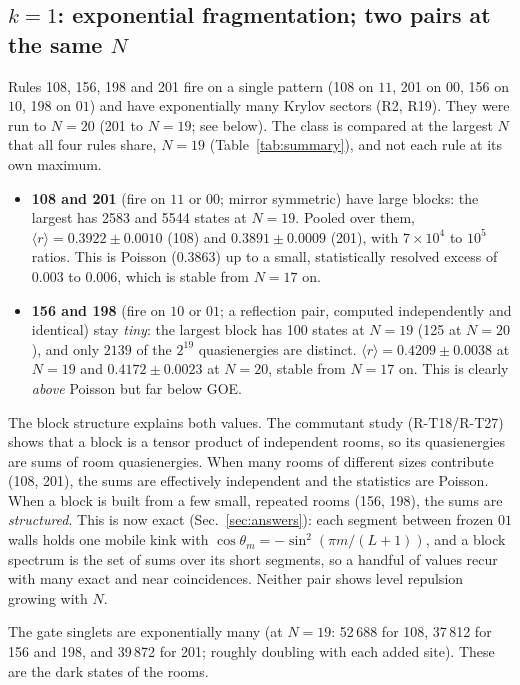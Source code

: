 \subsection{$k=1$: exponential fragmentation; two pairs at the same $N$}
Rules 108, 156, 198 and 201 fire on a single pattern (108 on $11$, 201 on $00$, 156 on $10$, 198 on $01$) and have
exponentially many Krylov sectors (R2, R19). They were run to $N=20$ (201 to $N=19$; see below). The class is compared
at the largest $N$ that all four rules share, $N=19$ (Table~\ref{tab:summary}), and not each rule at its own maximum.
\begin{itemize}
\item \textbf{108 and 201} (fire on $11$ or $00$; mirror symmetric) have large blocks: the largest has 2583 and 5544
  states at $N=19$. Pooled over them, $\langle r\rangle=0.3922\pm0.0010$ (108) and $0.3891\pm0.0009$ (201), with
  $7\times10^4$ to $10^5$ ratios. This is Poisson ($0.3863$) up to a small, statistically resolved excess of
  0.003 to 0.006, which is stable from $N=17$ on.
\item \textbf{156 and 198} (fire on $10$ or $01$; a reflection pair, computed independently and identical) stay
  \emph{tiny}: the largest block has 100 states at $N=19$ (125 at $N=20$), and only $2139$ of the $2^{19}$ quasienergies are
  distinct. $\langle r\rangle=0.4209\pm0.0038$ at $N=19$ and $0.4172\pm0.0023$ at $N=20$, stable from $N=17$ on.
  This is clearly \emph{above} Poisson but far below GOE.
\end{itemize}
The block structure explains both values. The commutant study (R-T18/R-T27) shows that a block is a tensor product of
independent rooms, so its quasienergies are sums of room quasienergies. When many rooms of different sizes contribute
(108, 201), the sums are effectively independent and the statistics are Poisson. When a block is built from a few small,
repeated rooms (156, 198), the sums are \emph{structured}. This is now exact (Sec.~\ref{sec:answers}): each
segment between frozen $01$ walls holds one mobile kink with $\cos\theta_m=-\sin^2(\pi m/(L+1))$, and a block
spectrum is the set of sums over its short segments, so a handful of values recur with many exact and near coincidences. Neither pair shows level
repulsion growing with $N$.

The gate singlets are exponentially many (at $N=19$: 52\,688 for 108, 37\,812 for 156 and 198, and 39\,872 for 201;
roughly doubling with each added site). These are the dark states of the rooms.

